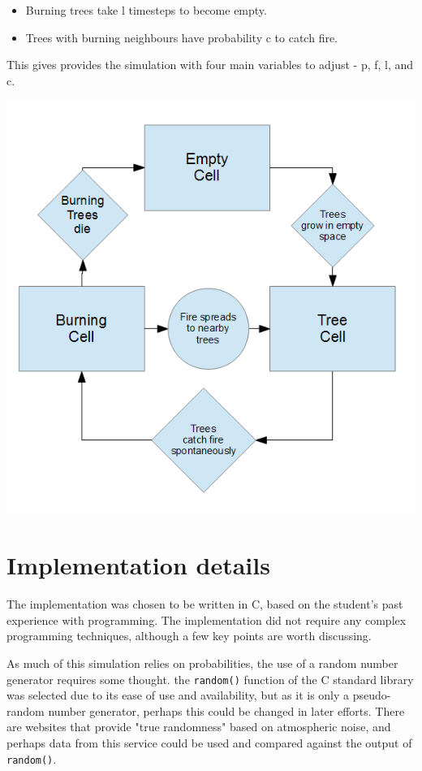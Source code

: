 \documentclass[11pt,a4paper]{report}
\begin{document}
\begin{itemize}
\item Burning trees take l timesteps to become empty.
\item Trees with burning neighbours have probability c to catch fire.
\end{itemize}

This gives provides the simulation with four main variables to adjust - p, f,
l, and c.

\includegraphics{tex/flowchart}

\newpage
\section{Implementation details}

The implementation was chosen to be written in C, based on the student's past
experience with programming. The implementation did not require any complex
programming techniques, although a few key points are worth discussing.

As much of this simulation relies on probabilities, the use of a random number
generator requires some thought. the \texttt{random()} function of the C
standard library was selected due to its ease of use and availability, but as
it is only a pseudo-random number generator, perhaps this could be changed in
later efforts. There are websites that provide "true randomness" based on
atmospheric noise\cite{random}, and perhaps data from this service could be
used and compared against the output of \texttt{random()}.
\end{document}
